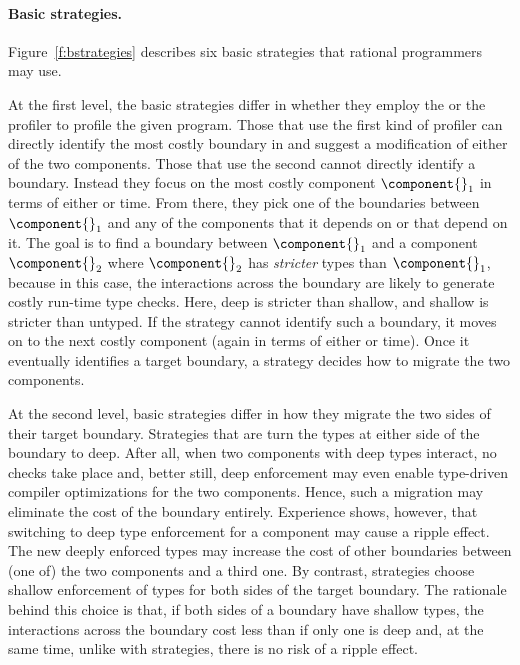 \paragraph{Basic strategies.}  Figure~\ref{f:bstrategies} describes six basic
 strategies that rational programmers may use. 

At the first level, the basic strategies differ in whether they employ the
 \featkw{} or the \statkw{} profiler to profile the given program.  Those that
 use the first kind of profiler can directly identify the most costly boundary
 in \program{} and suggest a modification of either of the two components.
 Those that use the second cannot directly identify a boundary.  Instead they
 focus on the most costly component $\component{}_1$ in terms of either
 \selfkw{} or \totalkw{} time.  From there, they pick one of the boundaries
 between $\component{}_1$ and any of the components that it depends on or that
 depend on it. The goal is to find a boundary between $\component{}_1$ and a
 component $\component{}_2$ where $\component{}_2$ has \emph{stricter} types
 than $\component{}_1$, because in this case, the interactions across the
 boundary are likely to generate costly run-time type checks. Here, deep is
 stricter than shallow, and shallow is stricter than untyped. If the strategy
 cannot identify such a boundary, it moves on to the next costly component
 (again in terms of either \selfkw{} or \totalkw{} time). Once it eventually
 identifies a target boundary, a \statkw{} strategy decides how to migrate the
 two components.

At the second level, basic strategies differ in how they migrate the two sides
 of their target boundary. Strategies that are \optkw{} turn the types at either
 side of the boundary to deep. After all, when two components with deep types
 interact, no checks take place and, better still, deep enforcement may even
 enable type-driven compiler optimizations for the two components.  Hence, such
 a migration may eliminate the cost of the boundary entirely.  Experience shows,
 however, that switching to deep type enforcement for a component may cause a
 ripple effect. The new deeply enforced types may increase the cost of other
 boundaries between (one of) the two components and a third one. By contrast,
 \conkw{} strategies choose shallow enforcement of types for both sides of the
 target boundary. The rationale behind this choice is that, if both sides of a
 boundary have shallow types, the interactions across the boundary cost less
 than if only one is deep and, at the same time, unlike with \optkw{}
 strategies, there is no risk of a ripple effect.

